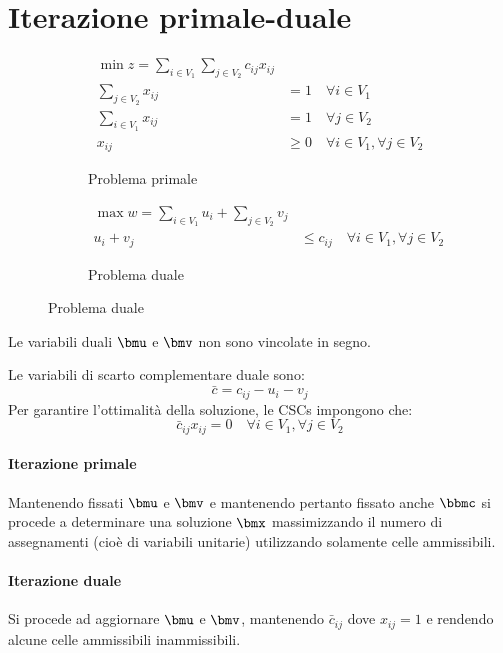 \documentclass[\main/main.tex]{subfiles}
\begin{document}
\section{Iterazione primale-duale}
\begin{figure}
	\begin{subfigure}{0.49\textwidth}
		\begin{align*}
			\min z = \sum_{i \in V_1} \sum_{j \in V_2} c_{ij}x_{ij}                    \\
			\sum_{j \in V_2}x_{ij} & = 1 \quad \forall i \in V_1                       \\
			\sum_{i \in V_1}x_{ij} & = 1 \quad \forall j \in V_2                       \\
			x_{ij}                 & \geq 0 \quad \forall i \in V_1, \forall j \in V_2
		\end{align*}
		\caption{Problema primale}
	\end{subfigure}
	\begin{subfigure}{0.49\textwidth}
		\begin{align*}
			\max w = \sum_{i\in V_1} u_i + \sum_{j \in V_2} v_j             \\
			u_i + v_j & \leq c_{ij}\quad \forall i \in V_1, \forall j \in V_2
		\end{align*}
		\caption{Problema duale}
	\end{subfigure}
\end{figure}
Le variabili duali \(\bmu \) e \(\bmv \) non sono vincolate in segno.

Le variabili di scarto complementare duale sono:
\[
	\bar{c} = c_{ij} - u_i - v_j
\]
Per garantire l'ottimalità della soluzione, le CSCs impongono che:
\[
	\bar{c}_{ij}x_{ij} = 0 \quad \forall i \in V_1, \forall j \in V_2
\]

\paragraph*{Iterazione primale} Mantenendo fissati \(\bmu \) e \(\bmv \) e mantenendo pertanto fissato anche \(\bbmc \) si procede a determinare una soluzione \(\bmx \) massimizzando il numero di assegnamenti (cioè di variabili unitarie) utilizzando solamente celle ammissibili.
\paragraph*{Iterazione duale} Si procede ad aggiornare \(\bmu \) e \(\bmv \), mantenendo \(\bar{c}_{ij}\) dove \(x_{ij} = 1\) e rendendo alcune celle ammissibili inammissibili.
\end{document}

